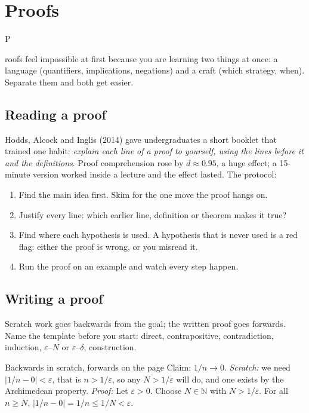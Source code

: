 \documentclass{kaelearn}
\begin{document}
\section{Proofs}

\opening{P}{roofs feel} impossible at first because you are learning two things at once: a language
(quantifiers, implications, negations) and a craft (which strategy, when). Separate them and both
get easier.

\subsection{Reading a proof}
Hodds, Alcock and Inglis (2014) gave undergraduates a short booklet that trained one habit:
\emph{explain each line of a proof to yourself, using the lines before it and the definitions}.
Proof comprehension rose by $d\approx0.95$, a huge effect; a 15-minute version worked inside a
lecture and the effect lasted. The protocol:
\begin{enumerate}
  \item Find the main idea first. Skim for the one move the proof hangs on.
  \item Justify every line: which earlier line, definition or theorem makes it true?
  \item Find where each hypothesis is used. A hypothesis that is never used is a red flag: either the
        proof is wrong, or you misread it.
  \item Run the proof on an example and watch every step happen.
\end{enumerate}

\subsection{Writing a proof}
Scratch work goes backwards from the goal; the written proof goes forwards. Name the template before
you start: direct, contrapositive, contradiction, induction, $\varepsilon$--$N$ or
$\varepsilon$--$\delta$, construction.

\begin{example}{Backwards in scratch, forwards on the page}
Claim: $1/n\to0$. \emph{Scratch:} we need $|1/n-0|<\varepsilon$, that is $n>1/\varepsilon$, so any
$N>1/\varepsilon$ will do, and one exists by the Archimedean property. \emph{Proof:} Let
$\varepsilon>0$. Choose $N\in\mathbb N$ with $N>1/\varepsilon$. For all $n\ge N$,
$|1/n-0|=1/n\le1/N<\varepsilon$. \hfill\qedsymbol
\end{example}
\end{document}
